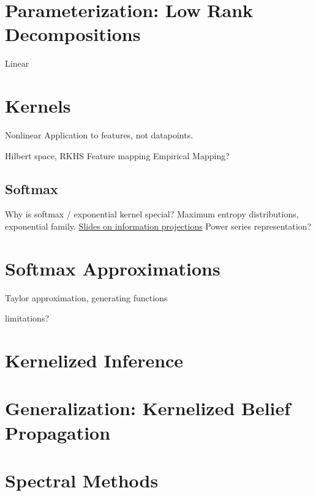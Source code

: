 \documentclass{article}
\begin{document}
\section{Parameterization: Low Rank Decompositions}
Linear

\section{Kernels}
Nonlinear
Application to features, not datapoints.

Hilbert space, RKHS
Feature mapping
Empirical Mapping?

\subsection{Softmax}
Why is softmax / exponential kernel special?
Maximum entropy distributions, exponential family.
\href{https://www.lix.polytechnique.fr/~nielsen/CIG-slides.pdf}{Slides on information projections}
Power series representation?

\section{Softmax Approximations}
Taylor approximation, generating functions

limitations?

\section{Kernelized Inference}

\section{Generalization: Kernelized Belief Propagation}

\section{Spectral Methods}



\end{document}
